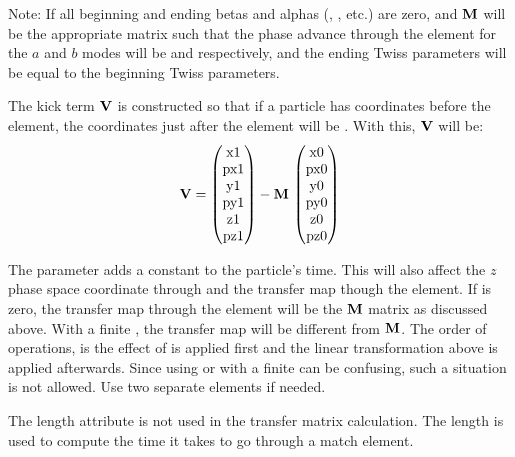 {Note: If all beginning and ending betas and alphas (, , etc.) are zero, and
${\bf M}$ will be the appropriate matrix such that the phase advance through the element for the $a$
and $b$ modes will be  and  respectively, and the ending Twiss parameters will
be equal to the beginning Twiss parameters.

The kick term ${\bf V}$ is constructed so that if a particle has
coordinates  before the 
element, the coordinates just after the element will be . With this, ${\bf V}$ will be:
\begin{equation}
  {\bf V} = 
    \begin{pmatrix} 
    \text{x1} \\ \text{px1} \\ \text{y1} \\ \text{py1} \\ \text{z1} \\ \text{pz1} 
    \end{pmatrix} -
    {\bf M} \, \begin{pmatrix} 
    \text{x0} \\ \text{px0} \\ \text{y0} \\ \text{py0} \\ \text{z0} \\ \text{pz0} 
    \end{pmatrix}
\end{equation}

The  parameter adds a constant to the particle's time. This will also affect the $z$
phase space coordinate through  and the transfer map though the element. If
 is zero, the transfer map through the element will be the ${\bf M}$ matrix as
discussed above. With a finite , the transfer map will be different from ${\bf M}$.
The order of operations, is the effect of  is applied first and the linear
transformation above is applied afterwards. Since using  or  with
a finite  can be confusing, such a situation is not allowed. Use two separate
 elements if needed.

The length attribute  is not used in the transfer matrix calculation. The length  is
used to compute the time it takes to go through a match element.

}
